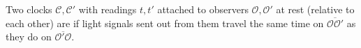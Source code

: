 \documentclass[../relativity_main.tex]{subfiles}
\begin{document}
\begin{defi}\label{defi:einstein_synchrony}
	Two clocks $\mathcal{C}, \mathcal{C}'$ with readings $t, t'$ attached to observers $\mathcal{O}, \mathcal{O}'$ at rest (relative to each other) are  if light signals sent out from them travel the same time on $\overline{\mathcal{O} \mathcal{O}'}$ as they do on $\overline{\mathcal{O}' \mathcal{O}}$.
\end{defi}
\end{document}
